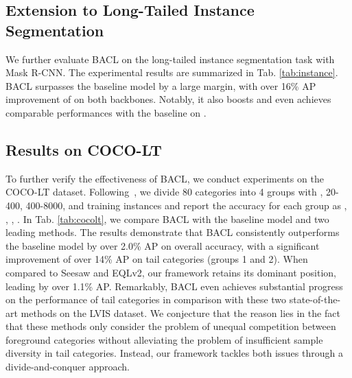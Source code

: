 \documentclass[lettersize,journal]{IEEEtran}
\begin{document}
\subsection{Extension to Long-Tailed Instance Segmentation}
We further evaluate BACL on the long-tailed instance segmentation task with Mask R-CNN.
The experimental results are summarized in Tab. \ref{tab:instance}.
BACL surpasses the baseline model by a large margin, with over 16\% AP improvement of  on both backbones.
Notably, it also boosts  and even achieves comparable performances with the baseline on .

\subsection{Results on COCO-LT}
To further verify the effectiveness of BACL, we conduct experiments on the COCO-LT dataset.
Following~\cite{wang2020devil}, we divide 80 categories into 4 groups with , 20-400, 400-8000, and  training instances and report the accuracy for each group as , , , .
In Tab. \ref{tab:cocolt}, we compare BACL with the baseline model and two leading methods.
The results demonstrate that BACL consistently outperforms the baseline model by over 2.0\% AP on overall accuracy, with a significant improvement of over 14\% AP on tail categories (groups 1 and 2).
When compared to Seesaw and EQLv2, our framework retains its dominant position, leading by over 1.1\% AP.
Remarkably, BACL even achieves substantial progress on the performance of tail categories in comparison with these two state-of-the-art methods on the LVIS dataset.
We conjecture that the reason lies in the fact that these methods only consider the problem of unequal competition between foreground categories without alleviating the problem of insufficient sample diversity in tail categories.
Instead, our framework tackles both issues through a divide-and-conquer approach.
 
\end{document}
